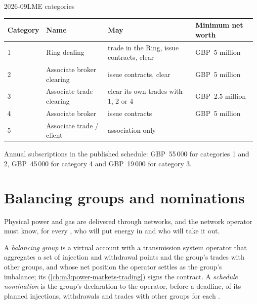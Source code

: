 \begin{dated}{2026-09}{LME categories}\label{dat:m3:getting-access-commodities-and-power:lme}
\begin{center}
\footnotesize
\begin{tabular}{llll}
\toprule
Category & Name & May & Minimum net worth \\
\midrule
1 & Ring dealing & trade in the Ring, issue contracts, clear & GBP~5 million \\
2 & Associate broker clearing & issue contracts, clear & GBP~5 million \\
3 & Associate trade clearing & clear its own trades with 1, 2 or 4 & GBP~2.5 million \\
4 & Associate broker & issue contracts & GBP~5 million \\
5 & Associate trade / client & association only & --- \\
\bottomrule
\end{tabular}
\end{center}
Annual subscriptions in the published schedule: GBP~55\,000 for categories 1 and 2, GBP~45\,000 for
category 4 and GBP~19\,000 for category 3.
\end{dated}

\section{Balancing groups and nominations}

Physical power and gas are delivered through networks, and the network operator must know, for every
, who will put energy in and who will take it out.

\begin{definition}\label{def:m3:getting-access-commodities-and-power:group}
A \emph{balancing group} is a virtual account with a transmission system operator
that aggregates a set of injection and withdrawal points and the group's trades with other groups, and whose
net position the operator settles as the group's imbalance; its 
(\cref{ch:m3:power-markets-trading}) signs the contract. A \emph{schedule nomination} is the group's declaration to the operator, before a deadline, of its planned injections,
withdrawals and trades with other groups for each .
\end{definition}

